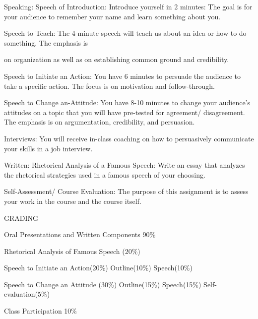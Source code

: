 \documentclass{英语试卷}
\begin{document}
\par Speaking: Speech of Introduction: Introduce yourself in 2 minutes: The goal is for your audience to remember your name and learn something about you.\par
\par Speech to Teach: The 4-minute speech will teach us about an idea or how to do something. The emphasis is\par
\par on organization as well as on establishing common ground and credibility.\par
\par Speech to Initiate an Action: You have 6 minutes to persuade the audience to take a specific action. The focus is on motivation and follow-through.\par
\par Speech to Change an-Attitude: You have 8-10 minutes to change your audience's attitudes on a topic that you will have pre-tested for agreement/ disagreement. The emphasis is on argumentation, credibility, and persuasion.\par
\par Interviews: You will receive in-class coaching on how to persuasively communicate your skills in a job interview.\par
\par Written: Rhetorical Analysis of a Famous Speech: Write an essay that analyzes the rhetorical strategies used in a famous speech of your choosing.\par
\par Self-Assessment/ Course Evaluation: The purpose of this assignment is to assess your work in the course and the course itself.\par
\par GRADING\par
\par Oral Presentations and Written Components 90\%\par
\par Rhetorical Analysis of Famous Speech (20\%)\par
\par Speech to Initiate an Action(20\%) Outline(10\%) Speech(10\%)\par
\par Speech to Change an Attitude (30\%) Outline(15\%) Speech(15\%) Self-evaluation(5\%)\par
\par Class Participation 10\%\par
\end{document}
